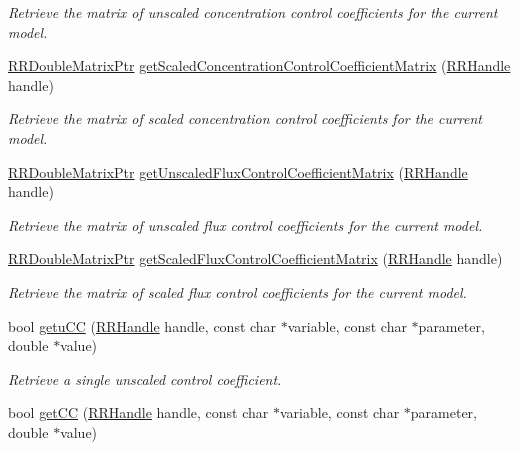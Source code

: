 \begin{DoxyCompactItemize}
\begin{DoxyCompactList}\small\item\em Retrieve the matrix of unscaled concentration control coefficients for the current model. \end{DoxyCompactList}\item 
\hyperlink{rrc__types_8h_ae586a879d30f0823087e42d93464b5dd}{R\+R\+Double\+Matrix\+Ptr} \hyperlink{group__mca_ga9933c9181db0991fd502e76a1151a98f}{get\+Scaled\+Concentration\+Control\+Coefficient\+Matrix} (\hyperlink{rrc__types_8h_a1d68f0592372208fa5a5f2799ea4b3ae}{R\+R\+Handle} handle)
\begin{DoxyCompactList}\small\item\em Retrieve the matrix of scaled concentration control coefficients for the current model. \end{DoxyCompactList}\item 
\hyperlink{rrc__types_8h_ae586a879d30f0823087e42d93464b5dd}{R\+R\+Double\+Matrix\+Ptr} \hyperlink{group__mca_ga814b6a3331bd0e31f59b0c2ef82f6a1c}{get\+Unscaled\+Flux\+Control\+Coefficient\+Matrix} (\hyperlink{rrc__types_8h_a1d68f0592372208fa5a5f2799ea4b3ae}{R\+R\+Handle} handle)
\begin{DoxyCompactList}\small\item\em Retrieve the matrix of unscaled flux control coefficients for the current model. \end{DoxyCompactList}\item 
\hyperlink{rrc__types_8h_ae586a879d30f0823087e42d93464b5dd}{R\+R\+Double\+Matrix\+Ptr} \hyperlink{group__mca_ga4428693777e8c5e858709a455495d653}{get\+Scaled\+Flux\+Control\+Coefficient\+Matrix} (\hyperlink{rrc__types_8h_a1d68f0592372208fa5a5f2799ea4b3ae}{R\+R\+Handle} handle)
\begin{DoxyCompactList}\small\item\em Retrieve the matrix of scaled flux control coefficients for the current model. \end{DoxyCompactList}\item 
bool \hyperlink{group__mca_gae8316aebf007cc8ea676ac3ed1ed1168}{getu\+C\+C} (\hyperlink{rrc__types_8h_a1d68f0592372208fa5a5f2799ea4b3ae}{R\+R\+Handle} handle, const char $\ast$variable, const char $\ast$parameter, double $\ast$value)
\begin{DoxyCompactList}\small\item\em Retrieve a single unscaled control coefficient. \end{DoxyCompactList}\item 
bool \hyperlink{group__mca_ga65db235364c7a461c95b95cf492a8f8b}{get\+C\+C} (\hyperlink{rrc__types_8h_a1d68f0592372208fa5a5f2799ea4b3ae}{R\+R\+Handle} handle, const char $\ast$variable, const char $\ast$parameter, double $\ast$value)

\end{DoxyCompactItemize}

